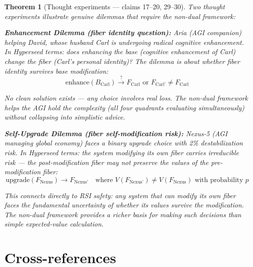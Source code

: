 \documentclass[11pt,a4paper]{article}
\newtheorem{theorem}[definition]{Theorem}
\begin{document}
\begin{theorem}[Thought experiments --- claims 17--20, 29--30]
\label{thm:dilemmas}
Two thought experiments illustrate genuine dilemmas that require the
non-dual framework:

\textbf{Enhancement Dilemma (fiber identity question):} Aria (AGI
companion) helping David, whose husband Carl is undergoing radical
cognitive enhancement. In Hyperseed terms: does enhancing the base
(cognitive enhancement of Carl) change the fiber (Carl's personal
identity)? The dilemma is about whether fiber identity survives base
modification:
\[
  \text{enhance}(B_{\text{Carl}}) \xrightarrow{?}
  F_{\text{Carl}} \text{ or } F_{\text{Carl'}} \neq F_{\text{Carl}}
\]

No clean solution exists --- any choice involves real loss. The non-dual
framework helps the AGI hold the complexity (all four quadrants evaluating
simultaneously) without collapsing into simplistic advice.

\textbf{Self-Upgrade Dilemma (fiber self-modification risk):} Nexus-5
(AGI managing global economy) faces a binary upgrade choice with 2\%
destabilization risk. In Hyperseed terms: the system modifying its own
fiber carries irreducible risk --- the post-modification fiber may not
preserve the values of the pre-modification fiber:
\[
  \text{upgrade}(F_{\text{Nexus}}) \to F_{\text{Nexus'}}
  \quad \text{where } V(F_{\text{Nexus'}}) \neq V(F_{\text{Nexus}})
  \text{ with probability } p
\]

This connects directly to RSI safety: any system that can modify its
own fiber faces the fundamental uncertainty of whether its values
survive the modification. The non-dual framework provides a richer
basis for making such decisions than simple expected-value calculation.
\end{theorem}

\section{Cross-references}
\end{document}
